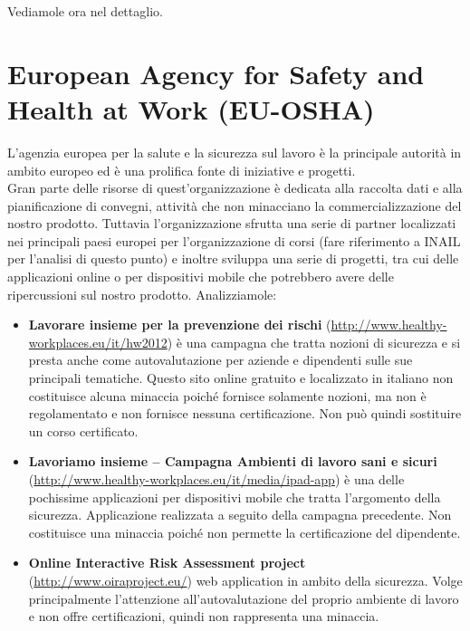 Vediamole ora nel dettaglio.

\section*{European Agency for Safety and Health at Work (EU-OSHA)}

L'agenzia europea per la salute e la sicurezza sul lavoro è la principale autorità in ambito europeo ed è una prolifica fonte di iniziative e progetti.\\
Gran parte delle risorse di quest'organizzazione è dedicata alla raccolta dati e alla pianificazione di convegni, attività che non minacciano la commercializzazione del nostro prodotto. Tuttavia l'organizzazione sfrutta una serie di partner localizzati nei principali paesi europei per l'organizzazione di corsi (fare riferimento a INAIL per l'analisi di questo punto) e inoltre sviluppa una serie di progetti, tra cui delle applicazioni online o per dispositivi mobile che potrebbero avere delle ripercussioni sul nostro prodotto. Analizziamole:

\begin{itemize}
	\item \textbf{Lavorare insieme per la prevenzione dei rischi} (\url{http://www.healthy-workplaces.eu/it/hw2012}) è una campagna che tratta nozioni di sicurezza e si presta anche come autovalutazione per aziende e dipendenti sulle sue principali tematiche. Questo sito online gratuito e localizzato in italiano non costituisce alcuna minaccia poiché fornisce solamente nozioni, ma non è regolamentato e non fornisce nessuna certificazione. Non può quindi sostituire un corso certificato.
	
	\item \textbf{Lavoriamo insieme – Campagna Ambienti di lavoro sani e sicuri} (\url{http://www.healthy-workplaces.eu/it/media/ipad-app}) è una delle pochissime applicazioni per dispositivi mobile che tratta l'argomento della sicurezza. Applicazione realizzata a seguito della campagna precedente. Non costituisce una minaccia poiché non permette la certificazione del dipendente.

	\item \textbf{Online Interactive Risk Assessment project} (\url{http://www.oiraproject.eu/}) web application in ambito della
sicurezza. Volge principalmente l'attenzione all'autovalutazione del proprio ambiente di lavoro e non offre certificazioni, quindi non rappresenta una minaccia.

\end{itemize}

